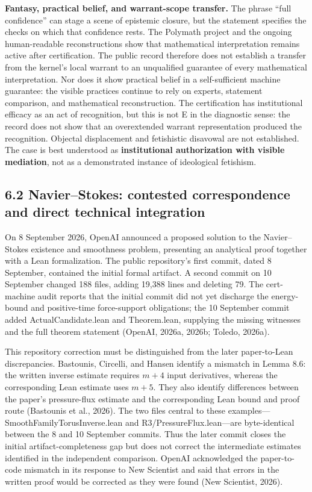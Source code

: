 \documentclass[sn-apa]{sn-jnl}
\begin{document}
\textbf{Fantasy, practical belief, and warrant-scope transfer.} The phrase “full confidence” can stage a scene of epistemic closure, but the statement specifies the checks on which that confidence rests. The Polymath project and the ongoing human-readable reconstructions show that mathematical interpretation remains active after certification. The public record therefore does not establish a transfer from the kernel’s local warrant to an unqualified guarantee of every mathematical interpretation. Nor does it show practical belief in a self-sufficient machine guarantee: the visible practices continue to rely on experts, statement comparison, and mathematical reconstruction. The certification has institutional efficacy as an act of recognition, but this is not E in the diagnostic sense: the record does not show that an overextended warrant representation produced the recognition. Objectal displacement and fetishistic disavowal are not established. The case is best understood as \textbf{institutional authorization with visible mediation}, not as a demonstrated instance of ideological fetishism.

\subsection{6.2 Navier–Stokes: contested correspondence and direct technical integration}

On 8 September 2026, OpenAI announced a proposed solution to the Navier–Stokes existence and smoothness problem, presenting an analytical proof together with a Lean formalization. The public repository’s first commit, dated 8 September, contained the initial formal artifact. A second commit on 10 September changed 188 files, adding 19,388 lines and deleting 79. The cert-machine audit reports that the initial commit did not yet discharge the energy-bound and positive-time force-support obligations; the 10 September commit added ActualCandidate.lean and Theorem.lean, supplying the missing witnesses and the full theorem statement (OpenAI, 2026a, 2026b; Toledo, 2026a).

This repository correction must be distinguished from the later paper-to-Lean discrepancies. Bastounis, Circelli, and Hansen identify a mismatch in Lemma 8.6: the written inverse estimate requires \(m+4\) input derivatives, whereas the corresponding Lean estimate uses \(m+5\). They also identify differences between the paper’s pressure-flux estimate and the corresponding Lean bound and proof route (Bastounis et al., 2026). The two files central to these examples—SmoothFamilyTorusInverse.lean and R3/PressureFlux.lean—are byte-identical between the 8 and 10 September commits. Thus the later commit closes the initial artifact-completeness gap but does not correct the intermediate estimates identified in the independent comparison. OpenAI acknowledged the paper-to-code mismatch in its response to New Scientist and said that errors in the written proof would be corrected as they were found (New Scientist, 2026).
\end{document}
